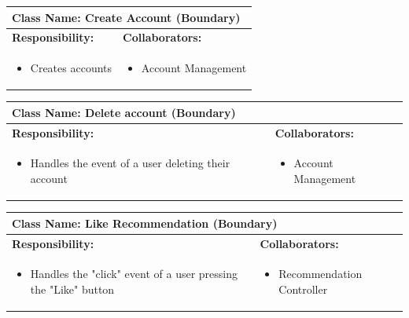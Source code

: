 \documentclass[]{article}
\begin{document}
\begin{table}[H]
	\centering
	\begin{tabular}{|p{7cm}|p{7cm}|}
	\hline 
	 \multicolumn{2}{|l|}{\textbf{Class Name:} Create Account (Boundary)} \\
	\hline
	\textbf{Responsibility:} & \textbf{Collaborators:} \\
	\hline
	\raggedright
	\begin{itemize}
		\item Creates accounts
	\end{itemize}
	\vspace{1in} & 
	\begin{itemize}
		\item Account Management
	\end{itemize} \\
	\hline
	\end{tabular}
\end{table}

\begin{table}[H]
	\centering
	\begin{tabular}{|p{7cm}|p{7cm}|}
	\hline 
	 \multicolumn{2}{|l|}{\textbf{Class Name:} Delete account (Boundary)} \\
	\hline
	\textbf{Responsibility:} & \textbf{Collaborators:} \\
	\hline
	\raggedright
	\begin{itemize}
		\item Handles the event of a user deleting their account
	\end{itemize}
	\vspace{1in} & 
	\begin{itemize}
		\item Account Management
	\end{itemize} \\
	\hline
	\end{tabular}
\end{table}

\begin{table}[H]
	\centering
	\begin{tabular}{|p{7cm}|p{7cm}|}
	\hline 
	 \multicolumn{2}{|l|}{\textbf{Class Name:} Like Recommendation (Boundary)} \\
	\hline
	\textbf{Responsibility:} & \textbf{Collaborators:} \\
	\hline
	\raggedright
	\begin{itemize}
		\item Handles the "click" event of a user pressing the "Like" button
	\end{itemize}
	\vspace{1in} & 
	\begin{itemize}
		\item Recommendation Controller
	\end{itemize} \\
	\hline
	\end{tabular}
\end{table}
\end{document}
